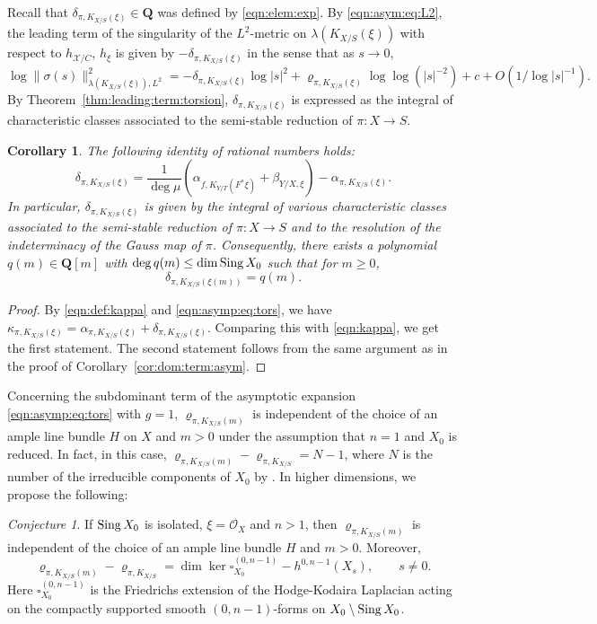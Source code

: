 \documentclass[amscd, leqno]{amsart}
\theoremstyle{plain}
\newtheorem{corollary}[theorem]{Corollary}
\theoremstyle{definition}
\theoremstyle{remark}
\newtheorem{conjecture}[theorem]{Conjecture}
\newenvironment{pf}{\begin{proof}}{\end{proof}}
\begin{document}
Recall that $\delta_{\pi, K_{X/S}(\xi)} \in {\mathbf Q}$ was defined by \eqref{eqn:elem:exp}. By \eqref{eqn:asym:eq:L2}, 
the leading term of the singularity of the $L^{2}$-metric on $\lambda(K_{X/S}(\xi))$ with respect to $h_{{\mathcal X}/C}$, 
$h_{\xi}$ is given by $-\delta_{\pi, K_{X/S}(\xi)}$ in the sense that as $s \to 0$,
$$
\log \| \sigma(s) \|_{\lambda(K_{X/S}(\xi)), L^{2}}^{2} 
= -\delta_{\pi, K_{X/S}(\xi)} \log |s|^{2} + \varrho_{\pi, K_{X/S}(\xi)} \log\log (|s|^{-2}) + c + O\left(1/\log |s|^{-1}\right).
$$
By Theorem~\ref{thm:leading:term:torsion}, $\delta_{\pi, K_{X/S}(\xi)}$ is expressed as the integral of characteristic classes associated 
to the semi-stable reduction of $\pi \colon X \to S$.


\begin{corollary}
\label{cor:sing:L2}
The following identity of rational numbers holds:
$$
\delta_{\pi, K_{X/S}(\xi)} = \frac{1}{\deg\mu} \left( \alpha_{f, K_{Y/T}(F^{*}\xi)} + \beta_{Y/X, \xi } \right) - \alpha_{\pi, K_{X/S}(\xi)}.
$$
In particular, $\delta_{\pi, K_{X/S}(\xi)}$ is given by the integral of various characteristic classes associated to the semi-stable reduction 
of $\pi \colon X \to S$ and to the resolution of the indeterminacy of the Gauss map of $\pi$. 
Consequently, there exists a polynomial $q(m) \in {\mathbf Q}[m]$ with $\deg q(m) \leq \dim {\rm Sing}\,X_{0}$ such that for $m \geq 0$,
$$
\delta_{\pi, K_{X/S}(\xi(m))} = q(m).
$$
\end{corollary}

\begin{pf}
By \eqref{eqn:def:kappa} and \eqref{eqn:asymp:eq:tors}, we have 
$\kappa_{\pi, K_{X/S}(\xi)} = \alpha_{\pi, K_{X/S}(\xi)} + \delta_{\pi, K_{X/S}(\xi)}$. 
Comparing this with \eqref{eqn:kappa}, we get the first statement. 
The second statement follows from the same argument as in the proof of Corollary~\ref{cor:dom:term:asym}.
\end{pf}


Concerning the subdominant term of the asymptotic expansion \eqref{eqn:asymp:eq:tors} with $g=1$, 
$\varrho_{\pi, K_{X/S}(m)}$ is independent of the choice of an ample line bundle $H$ on $X$ and $m>0$ under the assumption 
that $n=1$ and $X_{0}$ is reduced. In fact, in this case, $\varrho_{\pi, K_{X/S}(m)}-\varrho_{\pi, K_{X/S}} = N-1$, 
where $N$ is the number of the irreducible components of $X_{0}$ by \cite[Th.\,5.5]{DaiYoshikawa25}. 
In higher dimensions, we propose the following:


\begin{conjecture}
\label{conj:indep:rho}
If ${\rm Sing}\,X_{0}$ is isolated, $\xi={\mathcal O}_{X}$ and $n>1$, then $\varrho_{\pi, K_{X/S}(m)}$ is independent of the choice of 
an ample line bundle $H$ and $m>0$. Moreover, 
$$
\varrho_{\pi, K_{X/S}(m)}-\varrho_{\pi, K_{X/S}} = \dim \ker \square_{X_{0}}^{(0, n-1)} - h^{0,n-1}(X_{s}), 
\qquad
s\not=0.
$$ 
Here $\square_{X_{0}}^{(0,n-1)}$ is the Friedrichs extension of the Hodge-Kodaira Laplacian acting on the compactly supported 
smooth $(0,n-1)$-forms on $X_{0}\setminus{\rm Sing}\,X_{0}$.
\end{conjecture}
\end{document}
